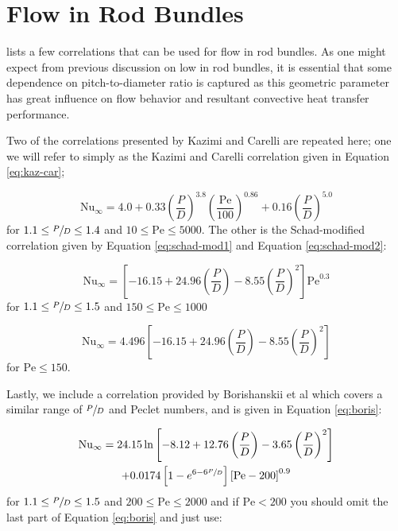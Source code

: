 \section{Flow in Rod Bundles}
 lists a few correlations that can be used for flow in rod bundles.  As one might expect from previous discussion on low in rod bundles, it is essential that some dependence on pitch-to-diameter ratio is captured as this geometric parameter has great influence on flow behavior and resultant convective heat transfer performance.

Two of the correlations presented by Kazimi and Carelli are repeated here\cite{kazami1976heat}; one we will refer to simply as the Kazimi and Carelli correlation given in Equation \ref{eq:kaz-car}; 

\begin{equation}
\text{Nu}_{\infty} = 4.0 + 0.33\left(\frac{P}{D}\right)^{3.8}\left(\frac{\text{Pe}}{100} \right)^{0.86} + 0.16 \left(\frac{P}{D}\right)^{5.0}
\label{eq:kaz-car}
\end{equation}
for $1.1 \le \sfrac{P}{D} \le 1.4$ and $10 \le \text{Pe} \le 5000$.
The other is the Schad-modified correlation given by Equation \ref{eq:schad-mod1} and Equation \ref{eq:schad-mod2}: 

\begin{equation}
\text{Nu}_{\infty} = \left[-16.15 + 24.96 \left(\frac{P}{D} \right) - 8.55 \left(\frac{P}{D} \right)^2 \right]\text{Pe}^{0.3}
\label{eq:schad-mod1}
\end{equation}
for $1.1 \le \sfrac{P}{D} \le 1.5$ and $150 \le \text{Pe} \le 1000$

\begin{equation}
\text{Nu}_{\infty} = 4.496\left[-16.15 + 24.96 \left(\frac{P}{D} \right) - 8.55 \left(\frac{P}{D} \right)^2 \right]
\label{eq:schad-mod2}
\end{equation}
for $\text{Pe} \le 150$.

Lastly, we include a correlation provided by Borishanskii et al \cite{borishanskii1969heat} which covers a similar range of $\sfrac{P}{D}$ and Peclet numbers, and is given in Equation \ref{eq:boris}: 

\begin{multline}
\text{Nu}_{\infty} = 24.15 \ln{\left[-8.12 + 12.76\left(\frac{P}{D}\right)-3.65 \left(\frac{P}{D} \right)^2  \right]} \\ + 0.0174\left[1 - e^{6 - 6\sfrac{P}{D}} \right] \left[\text{Pe} - 200 \right]^{0.9}
\label{eq:boris}
\end{multline}
for $1.1 \le \sfrac{P}{D} \le 1.5$ and $200 \le \text{Pe} \le 2000$ and if $\text{Pe}< 200$ you should omit the last part of Equation \ref{eq:boris} and just use:

